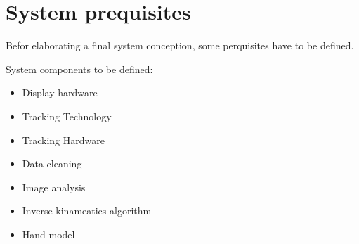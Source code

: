 \chapter{System prequisites}

Befor elaborating a final system conception, some perquisites have to be defined.

System components to be defined:
\begin{itemize}
 \item Display hardware
 \item Tracking Technology
 \item Tracking Hardware
 \item Data cleaning
 \item Image analysis
 \item Inverse kinameatics algorithm
 \item Hand model
 \end{itemize} 

